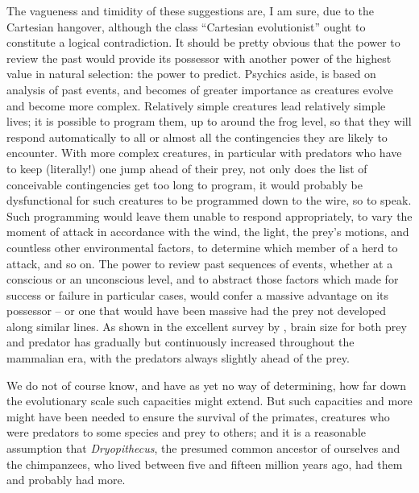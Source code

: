 The vagueness and timidity of these suggestions are, I am sure, due to the Cartesian hangover, although the class ``Cartesian evolutionist'' ought to constitute a logical contradiction. It should be pretty
obvious that the power to review the past would provide its possessor with another power of the highest value in natural selection: the power to predict. Psychics aside,  is based on analysis of past events, and becomes of greater importance as creatures evolve and become more complex. Relatively simple creatures lead relatively simple lives; it is possible to program them, up to around the frog level, so that they will respond automatically to all or almost all the contingencies they are likely to encounter. With more complex creatures, in particular with predators who have to keep (literally!) one jump ahead of their prey, not only does the list of conceivable contingencies get too long to program, it would probably be dysfunctional for such creatures to be programmed down to the wire, so to speak. Such programming would leave them unable to respond appropriately, to vary the moment of attack in accordance with the wind, the light, the prey's motions, and countless other environmental factors, to determine which member of a herd to attack, and so on. The power to review past sequences of events, whether at a conscious or an unconscious level, and to abstract those factors which made for success or failure in particular cases, would confer a massive advantage on its possessor -- or one that would have been massive had the prey not developed along similar lines. As shown in the excellent survey by \citet{Jerison1973}, brain size for both prey and predator has gradually but continuously increased throughout the mammalian era, with the predators always slightly ahead of the prey.

We do not of course know, and have as yet no way of determining, how far down the evolutionary scale such capacities might extend. But such capacities and more might have been needed to ensure the survival of the primates, creatures who were predators to some species and prey to others; and it is a reasonable assumption that \textit{Dryopithecus}, the presumed common ancestor of ourselves and the chimpanzees, who lived between five and fifteen million years ago, had them and probably had more.

